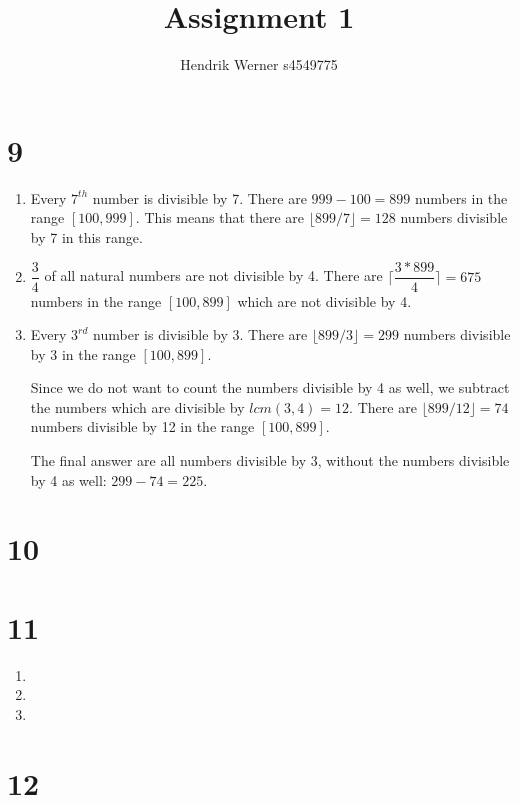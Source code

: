 \documentclass[12pt]{article}
\title{Assignment 1}
\author{
	Hendrik Werner s4549775
}
\begin{document}
\maketitle

\section*{9}
\begin{enumerate}[a]
	\item %
	Every $7^{th}$ number is divisible by 7. There are $999 - 100 = 899$ numbers in the range $[100, 999]$. This means that there are $\lfloor 899 / 7 \rfloor = 128$ numbers divisible by 7 in this range.
	\setcounter{enumi}{3} \item %
	$\dfrac{3}{4}$ of all natural numbers are not divisible by 4. There are $\lceil \dfrac{3 * 899}{4} \rceil = 675$ numbers in the range $[100, 899]$ which are not divisible by 4.
	\setcounter{enumi}{6} \item %
	Every $3^{rd}$ number is divisible by 3. There are $\lfloor 899 / 3 \rfloor = 299$ numbers divisible by 3 in the range $[100, 899]$.

	Since we do not want to count the numbers divisible by 4 as well, we subtract the numbers which are divisible by $lcm(3, 4) = 12$. There are $\lfloor 899 / 12 \rfloor = 74$ numbers divisible by 12 in the range $[100, 899]$.

	The final answer are all numbers divisible by 3, without the numbers divisible by 4 as well: $299 - 74 = 225$.
\end{enumerate}

\section*{10}

\section*{11}
\begin{enumerate}[a]
	\item %
	\item %
	\item %
\end{enumerate}

\section*{12}
\end{document}
